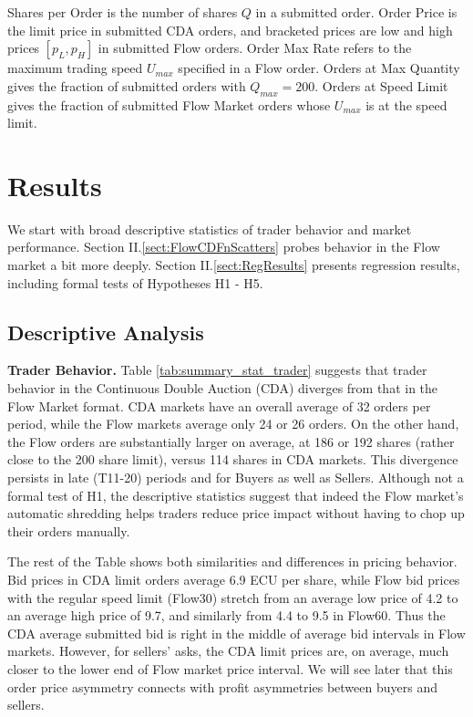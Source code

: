 \documentclass[12pt]{article}
\begin{document}
\begin{table}[t]
{\begin{threeparttable}
\begin{tablenotes}
Shares per Order is the number of shares $Q$ in a submitted order. 
Order Price is the limit price in submitted CDA orders, and bracketed prices are low and high prices $[p_L, p_H ]$ in submitted Flow orders. 
Order Max Rate refers to the maximum trading speed $U_{max}$ specified in a Flow order. 
Orders at Max Quantity gives the fraction of submitted orders with $Q_{max} = 200$. 
Orders at Speed Limit gives the fraction of submitted Flow Market orders whose $U_{max}$ is at the speed limit.
\end{tablenotes}
\end{threeparttable}
}
\end{table}

\vspace{-.15in}
\section{Results} \label{results}
\vspace{-.15in}
We start with broad descriptive statistics of trader behavior and market performance. Section II.\ref{sect:FlowCDFnScatters} probes behavior in the Flow market a bit more deeply.
Section II.\ref{sect:RegResults} presents regression results, including formal tests of Hypotheses H1 - H5.

\subsection{Descriptive Analysis}

\noindent \textbf{Trader Behavior.} 
Table \ref{tab:summary_stat_trader} suggests that trader behavior in the Continuous Double Auction (CDA) 
diverges from that in the Flow Market format. 
CDA markets have an overall average of 32 orders per period, while the Flow markets average only 24 or 26 orders. 
On the other hand, the Flow orders are substantially larger on average, at 186 or 192 shares 
(rather close to the 200 share limit), versus 114 shares in CDA markets. This divergence persists in  late (T11-20) periods and for Buyers as well as Sellers. Although not a formal test of H1, the descriptive statistics suggest that indeed the Flow market's automatic shredding helps traders reduce price impact without having to chop up their orders manually.  

The rest of the Table shows both similarities and differences in pricing behavior. 
Bid prices in CDA limit orders average 6.9 ECU per share, while Flow bid prices with the regular speed limit (Flow30) stretch from an average low price of 4.2 to an average high price of 9.7,
and similarly from 4.4 to 9.5 in Flow60.  
Thus the CDA average submitted bid is right in the middle of average bid intervals in Flow markets. However, for sellers' asks, the CDA limit prices are, on average, much closer to the lower end of Flow market price interval.  
We will see later that this order price asymmetry connects with profit asymmetries between buyers and sellers. 
\end{document}
